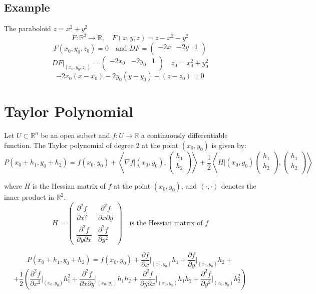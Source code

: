 \documentclass[11pt]{article}
\newcommand{\inner}[2]{\left\langle #1, #2 \right\rangle}
\begin{document}
\subsection*{Example}
The paraboloid $z = x^2 + y^2$ 
\[
F : \mathbb{R}^3 \rightarrow \mathbb{R}, \quad F(x,y,z) = z - x^2 - y^2
\]
\[
F(x_0,y_0,z_0) = 0 \quad \text{and } DF = \begin{pmatrix}
    -2x & -2y & 1 \\
\end{pmatrix}
\]
\[
DF\big|_{(x_0,y_0,z_0)} = \begin{pmatrix}
    -2x_0 & -2y_0 & 1 \\
\end{pmatrix} \quad z_0 = x_0^2 + y_0^2
\]
\[
-2x_0(x - x_0) - 2y_0(y - y_0) + (z - z_0) = 0
\]

\section{Taylor Polynomial}
Let $U \subset \mathbb{R}^n$ be an open subset and $f : U \rightarrow \mathbb{R}$ a continuously differentiable function. The Taylor polynomial of degree $2$ at the point $(x_0,y_0)$ is given by:
\[
P(x_0 + h_1, y_0 + h_2) = f(x_0,y_0) + \inner{\nabla f\big|{(x_0,y_0)}}{\begin{pmatrix}
    h_1 \\
    h_2 \\
\end{pmatrix}} + \frac{1}{2} \inner{H\big|{(x_0,y_0)}\begin{pmatrix}
    h_1 \\
    h_2 \\
\end{pmatrix}}{\begin{pmatrix}
    h_1 \\
    h_2 \\
\end{pmatrix}}
\]

where $H$ is the Hessian matrix of $f$ at the point $(x_0,y_0)$, and $\inner{\cdot}{\cdot}$ denotes the inner product in $\mathbb{R}^2$.
\[
H = \begin{pmatrix}
    \dfrac{\partial^2 f}{\partial x^2} & \dfrac{\partial^2 f}{\partial x \partial y} \\
    \dfrac{\partial^2 f}{\partial y \partial x} & \dfrac{\partial^2 f}{\partial y^2}
\end{pmatrix} \quad \text{is the Hessian matrix of } f
\]

\[
P(x_0 + h_1, y_0 + h_2) = f(x_0,y_0) + \frac{\partial f}{\partial x}\big|_{(x_0,y_0)} h_1 + \frac{\partial f}{\partial y}\big|_{(x_0,y_0)} h_2 + 
\]
\[
+ \frac{1}{2} \left(\frac{\partial^2 f}{\partial x^2}\big|_{(x_0,y_0)} h_1^2 + \frac{\partial^2 f}{\partial x \partial y}\big|_{(x_0,y_0)} h_1 h_2 + \frac{\partial^2 f}{\partial y \partial x}\big|_{(x_0,y_0)} h_1 h_2 + \frac{\partial^2 f}{\partial y^2}\big|_{(x_0,y_0)} h_2^2\right)
\]
\end{document}
